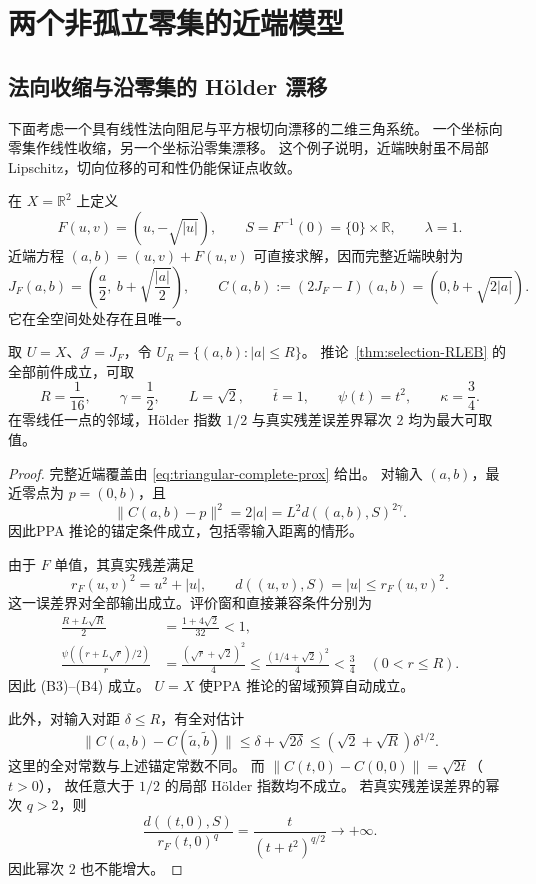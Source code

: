 \section{两个非孤立零集的近端模型}
\label{sec:examples}

\subsection{法向收缩与沿零集的 H\"older 漂移}
\label{sec:triangular-holder-example}

下面考虑一个具有线性法向阻尼与平方根切向漂移的二维三角系统。
一个坐标向零集作线性收缩，另一个坐标沿零集漂移。
这个例子说明，近端映射虽不局部 Lipschitz，切向位移的可和性仍能保证点收敛。

在 $X=\mathbb R^2$ 上定义
\[
 F(u,v)=(u,-\sqrt{|u|}),\qquad
 S=F^{-1}(0)=\{0\}\times\mathbb R,
 \qquad \lambda=1.
\]
近端方程 $(a,b)=(u,v)+F(u,v)$ 可直接求解，因而完整近端映射为
\begin{equation}
\label{eq:triangular-complete-prox}
 J_F(a,b)=\left(\frac a2,\ b+\sqrt{\frac{|a|}{2}}\right),
 \qquad
 C(a,b):=(2J_F-I)(a,b)=\left(0,b+\sqrt{2|a|}\right).
\end{equation}
它在全空间处处存在且唯一。

\begin{proposition}
\label{prop:triangular-critical-rleb}
取 $U=X$、$\mathcal J=J_F$，令 $U_R=\{(a,b):|a|\leq R\}$。
推论~\ref{thm:selection-RLEB} 的全部前件成立，可取
\[
 R=\frac1{16},\qquad \gamma=\frac12,
 \qquad L=\sqrt2,\qquad
 \bar t=1,\qquad \psi(t)=t^2,\qquad \kappa=\frac34.
\]
在零线任一点的邻域，Hölder 指数 $1/2$ 与真实残差误差界幂次 $2$
均为最大可取值。
\end{proposition}

\begin{proof}
完整近端覆盖由 \eqref{eq:triangular-complete-prox} 给出。
对输入 $(a,b)$，最近零点为 $p=(0,b)$，且
\[
 \|C(a,b)-p\|^2=2|a|=L^2d((a,b),S)^{2\gamma}.
\]
因此PPA 推论的锚定条件成立，包括零输入距离的情形。

由于 $F$ 单值，其真实残差满足
\[
 r_F(u,v)^2=u^2+|u|,\qquad
 d((u,v),S)=|u|\leq r_F(u,v)^2.
\]
这一误差界对全部输出成立。评价窗和直接兼容条件分别为
\[
 \begin{aligned}
 \frac{R+L\sqrt R}{2}&=\frac{1+4\sqrt2}{32}<1,\\
 \frac{\psi((r+L\sqrt r)/2)}r
 &=\frac{(\sqrt r+\sqrt2)^2}{4}
 \leq\frac{(1/4+\sqrt2)^2}{4}<\frac34
 \quad(0<r\leq R).
 \end{aligned}
\]
因此 (B3)--(B4) 成立。
$U=X$ 使PPA 推论的留域预算自动成立。

此外，对输入对距 $\delta\leq R$，有全对估计
\[
 \|C(a,b)-C(\widetilde a,\widetilde b)\|
 \leq\delta+\sqrt{2\delta}
 \leq(\sqrt2+\sqrt R)\delta^{1/2}.
\]
这里的全对常数与上述锚定常数不同。
而 $\|C(t,0)-C(0,0)\|=\sqrt{2t}$（$t>0$），
故任意大于 $1/2$ 的局部 Hölder 指数均不成立。
若真实残差误差界的幂次 $q>2$，则
\[
 \frac{d((t,0),S)}{r_F(t,0)^q}
 =\frac{t}{(t+t^2)^{q/2}}\longrightarrow+\infty.
\]
因此幂次 $2$ 也不能增大。
\end{proof}

